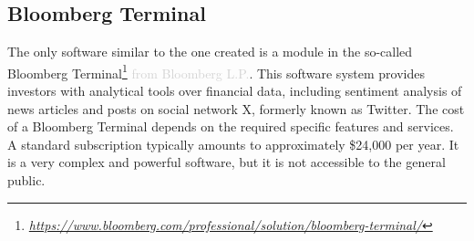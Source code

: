 \subsection{Bloomberg Terminal}
\label{subsec:bloomberg-terminal}

The only software similar to the one created is a module in the so-called Bloomberg Terminal\footnote{\href{https://www.bloomberg.com/professional/solution/bloomberg-terminal/}{\textit{https://www.bloomberg.com/professional/solution/bloomberg-terminal/}}} \textcolor{lightgray}{from Bloomberg L.P.}. This software system provides investors with analytical tools over financial data, including sentiment analysis of news articles and posts on social network X, formerly known as Twitter. The cost of a Bloomberg Terminal depends on the required specific features and services. \linebreak A standard subscription typically amounts to approximately \$24,000 per year. It is a very complex and powerful software, but it is not accessible to the general public.

